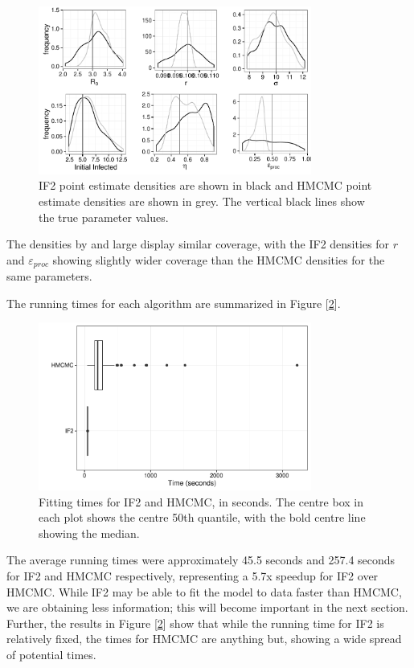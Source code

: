     \begin{figure}
        \centering
        \captionsetup{width=.8\linewidth}
        \includegraphics[width=0.8\textwidth]{./images/combined-multi.pdf}
        \caption{IF2 point estimate densities are shown in black and HMCMC point estimate densities are shown in grey. The vertical black lines show the true parameter values. \label{combinedmulti}}
    \end{figure}

    The densities by and large display similar coverage, with the IF2 densities for $r$ and $\varepsilon_{proc}$ showing slightly wider coverage than the HMCMC densities for the same parameters.

    The running times for each algorithm are summarized in Figure [\ref{timeplot}].

	\begin{figure}
        \centering
        \captionsetup{width=.8\linewidth}
        \includegraphics[width=0.8\textwidth]{./images/timeplot.pdf}
        \caption{Fitting times for IF2 and HMCMC, in seconds. The centre box in each plot shows the centre 50th quantile, with the bold centre line showing the median. \label{timeplot}}
    \end{figure}

    The average running times were approximately 45.5 seconds and 257.4 seconds for IF2 and HMCMC respectively, representing a 5.7x speedup for IF2 over HMCMC. While IF2 may be able to fit the model to data faster than HMCMC, we are obtaining less information; this will become important in the next section. Further, the results in Figure [\ref{timeplot}] show that while the running time for IF2 is relatively fixed, the times for HMCMC are anything but, showing a wide spread of potential times.
